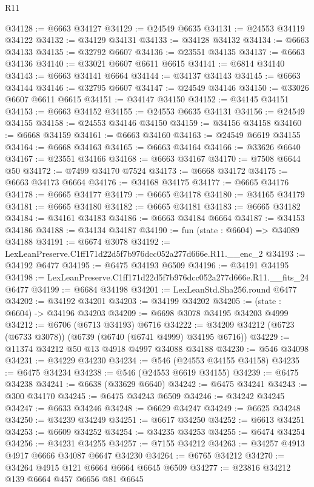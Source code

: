 \begin{lexlean}{R11}
\begin{coremodule}
@34128 := @6663 @34127
@34129 := @24549 @6635
@34131 := @24553 @34119 @34122
@34132 := @34129 @34131
@34133 := @34128 @34132
@34134 := @6663 @34133
@34135 := @32792 @6607
@34136 := @23551 @34135
@34137 := @6663 @34136
@34140 := @33021 @6607 @6611 @6615
@34141 := @6814 @34140
@34143 := @6663 @34141 @6664
@34144 := @34137 @34143
@34145 := @6663 @34144
@34146 := @32795 @6607
@34147 := @24549 @34146
@34150 := @33026 @6607 @6611 @6615
@34151 := @34147 @34150
@34152 := @34145 @34151
@34153 := @6663 @34152
@34155 := @24553 @6635 @34131
@34156 := @24549 @34155
@34158 := @24553 @34146 @34150
@34159 := @34156 @34158
@34160 := @6668 @34159
@34161 := @6663 @34160
@34163 := @24549 @6619 @34155
@34164 := @6668 @34163
@34165 := @6663 @34164
@34166 := @33626 @6640
@34167 := @23551 @34166
@34168 := @6663 @34167
@34170 := @7508 @6644 @50
@34172 := @7499 @34170 @7524
@34173 := @6668 @34172
@34175 := @6663 @34173 @6664
@34176 := @34168 @34175
@34177 := @6665 @34176
@34178 := @6665 @34177
@34179 := @6665 @34178
@34180 := @34165 @34179
@34181 := @6665 @34180
@34182 := @6665 @34181
@34183 := @6665 @34182
@34184 := @34161 @34183
@34186 := @6663 @34184 @6664
@34187 := @34153 @34186
@34188 := @34134 @34187
@34190 := fun (state : @6604) => @34089 @34188
@34191 := @6674 @3078
@34192 := LexLeanPreserve.C1ff171d22d5f7b976dcc052a277d666e.R11.__enc_2
@34193 := @34192 @6477
@34195 := @6475 @34193 @6509
@34196 := @34191 @34195
@34198 := LexLeanPreserve.C1ff171d22d5f7b976dcc052a277d666e.R11.__fits_24 @6477
@34199 := @6684 @34198
@34201 := LexLeanStd.Sha256.round @6477
@34202 := @34192 @34201
@34203 := @34199 @34202
@34205 := (state : @6604) -> @34196 @34203
@34209 := @6698 @3078 @34195 @34203 @4999
@34212 := @6706 (@6713 @34193) @6716
@34222 := @34209 @34212 (@6723 (@6733 @3078)) (@6739 (@6740 (@6741 @4999) @34195 @6716))
@34229 := @11374 @34212 @50 @13 @4918 @4997 @34088 @34188
@34230 := @546 @34098
@34231 := @34229 @34230
@34234 := @546 (@24553 @34155 @34158)
@34235 := @6475 @34234
@34238 := @546 (@24553 @6619 @34155)
@34239 := @6475 @34238
@34241 := @6638 (@33629 @6640)
@34242 := @6475 @34241
@34243 := @300 @34170
@34245 := @6475 @34243 @6509
@34246 := @34242 @34245
@34247 := @6633 @34246
@34248 := @6629 @34247
@34249 := @6625 @34248
@34250 := @34239 @34249
@34251 := @6617 @34250
@34252 := @6613 @34251
@34253 := @6609 @34252
@34254 := @34235 @34253
@34255 := @6474 @34254
@34256 := @34231 @34255
@34257 := @7155 @34212
@34263 := @34257 @4913 @4917 @6666 @34087 @6647 @34230
@34264 := @6765 @34212
@34270 := @34264 @4915 @121 @6664 @6664 @6645 @6509
@34277 := @23816 @34212 @139 @6664 @457 @6656 @81 @6645

\end{coremodule}
\end{lexlean}
